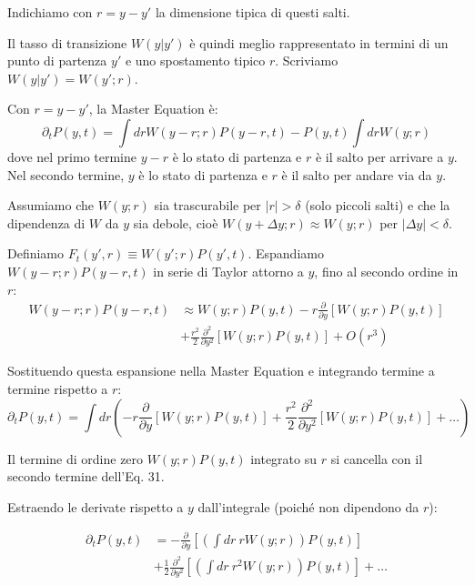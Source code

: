 Indichiamo con $r = y - y'$ la dimensione tipica di questi salti.

Il tasso di transizione $W(y | y')$ è quindi meglio rappresentato in termini di un punto di partenza $y'$ e uno spostamento tipico $r$. Scriviamo $W(y | y') = W(y'; r)$.

Con $r = y - y'$, la Master Equation è:
\begin{equation}
\partial_t P(y,t) = \int dr W(y-r; r) P(y-r, t) - P(y,t) \int dr W(y; r)
\end{equation}
dove nel primo termine $y-r$ è lo stato di partenza e $r$ è il salto per arrivare a $y$. Nel secondo termine, $y$ è lo stato di partenza e $r$ è il salto per andare via da $y$.

Assumiamo che $W(y;r)$ sia trascurabile per $|r| > \delta$ (solo piccoli salti) e che la dipendenza di $W$ da $y$ sia debole, cioè $W(y+\Delta y; r) \approx W(y; r)$ per $|\Delta y| < \delta$.

Definiamo $F_{t}(y',r) \equiv W(y'; r) P(y', t)$. Espandiamo $W(y-r; r)P(y-r, t)$ in serie di Taylor attorno a $y$, fino al secondo ordine in $r$:
\begin{align}
W(y-r; r)P(y-r, t) &\approx W(y;r)P(y,t) - r \frac{\partial}{\partial y}[W(y;r)P(y,t)] \nonumber \\  &+ \frac{r^2}{2} \frac{\partial^2}{\partial y^2}[W(y;r)P(y,t)] + O(r^3)
\end{align}


Sostituendo questa espansione nella Master Equation e integrando termine a termine rispetto a $r$:
\begin{equation*}
\partial_t P(y,t) = \int dr \left( -r \frac{\partial}{\partial y}[W(y;r)P(y,t)] + \frac{r^2}{2} \frac{\partial^2}{\partial y^2}[W(y;r)P(y,t)] + \dots \right)
\end{equation*}


Il termine di ordine zero $W(y;r)P(y,t)$ integrato su $r$ si cancella con il secondo termine dell'Eq. 31. 

Estraendo le derivate rispetto a $y$ dall'integrale (poiché non dipendono da $r$):

\begin{align}
\partial_t P(y,t) &= -\frac{\partial}{\partial y} \left[ \left( \int dr~r W(y;r) \right) P(y,t) \right] \nonumber \\ &+ \frac{1}{2}\frac{\partial^2}{\partial y^2} \left[ \left( \int dr~r^2 W(y;r) \right) P(y,t) \right] + \dots
\end{align}


